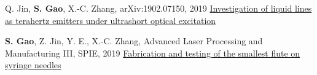 \begin{cventries}
  \cventry
    {Q. Jin, \textbf{S. Gao}, X.-C. Zhang, arXiv:1902.07150, 2019}
    {\href{https://arxiv.org/abs/1902.07150}{Investigation of liquid lines as terahertz emitters under ultrashort optical excitation}}
    {}{}{}

  \cventry
    {\textbf{S. Gao}, Z. Jin, Y. E., X.-C. Zhang, Advanced Laser Processing and Manufacturing III, SPIE, 2019}
    {\href{https://www.spiedigitallibrary.org/conference-proceedings-of-spie/11183/111830A/Fabrication-and-testing-of-the-smallest-flute-on-syringe-needles/10.1117/12.2538989.full}{Fabrication and testing of the smallest flute on syringe needles}}
    {}{}{}

\end{cventries}
